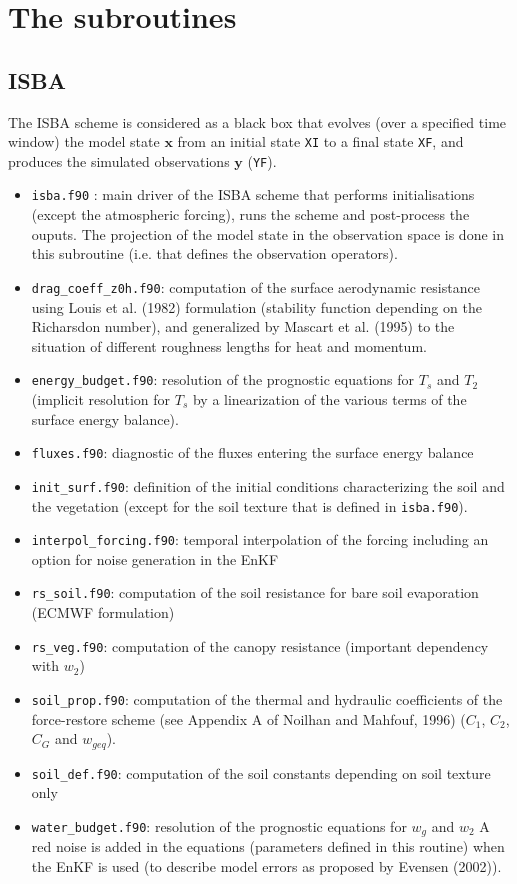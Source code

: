 \documentclass[12pt]{article}
\begin{document}
\section{The subroutines}
\subsection{ISBA}
The ISBA scheme is considered as a black box that evolves (over a specified time window)
the model state $\mathbf{x}$ from an
initial state {\tt XI} to a final state {\tt XF}, and produces the simulated observations
$\mathbf{y}$ ({\tt YF}). 
\vspace{0.5cm}
\begin{itemize}
\item {\tt isba.f90} : main driver of the ISBA scheme that performs initialisations (except the
atmospheric forcing), runs the scheme and post-process the ouputs. 
The projection of the model state in the observation space
is done in this subroutine (i.e. that defines the observation operators).
\item {\tt drag\_coeff\_z0h.f90}: computation of the surface aerodynamic resistance using
Louis et al. (1982) formulation (stability function depending on the Richarsdon number), and
generalized by Mascart et al. (1995) to the situation of different roughness lengths for heat
and momentum.
\item {\tt energy\_budget.f90}: resolution of the prognostic equations for $T_s$ and $T_2$
(implicit resolution for $T_s$ by a linearization of the various terms of the
surface energy balance).
\item {\tt fluxes.f90}: diagnostic of the fluxes entering the surface energy balance
\item {\tt init\_surf.f90}: definition of the initial conditions characterizing the soil
and the vegetation (except for the soil texture that is defined in {\tt isba.f90}).
\item {\tt interpol\_forcing.f90}: temporal interpolation of the forcing including
an option for noise generation in the EnKF 
\item {\tt rs\_soil.f90}: computation of the soil resistance for bare soil evaporation
(ECMWF formulation)
\item {\tt rs\_veg.f90}: computation of the canopy resistance (important dependency with $w_2$)
\item {\tt soil\_prop.f90}: computation of the thermal and hydraulic coefficients of
the force-restore scheme (see Appendix A of Noilhan and Mahfouf, 1996) ($C_1$, $C_2$, $C_G$ and $w_{geq}$).
\item {\tt soil\_def.f90}: computation of the soil constants depending on soil texture only
\item {\tt water\_budget.f90}: resolution of the prognostic equations for $w_g$ and $w_2$
A red noise is added in the equations (parameters defined in this routine) when the EnKF is used (to
describe model errors as proposed by Evensen (2002)).
\end{itemize}
\end{document}
